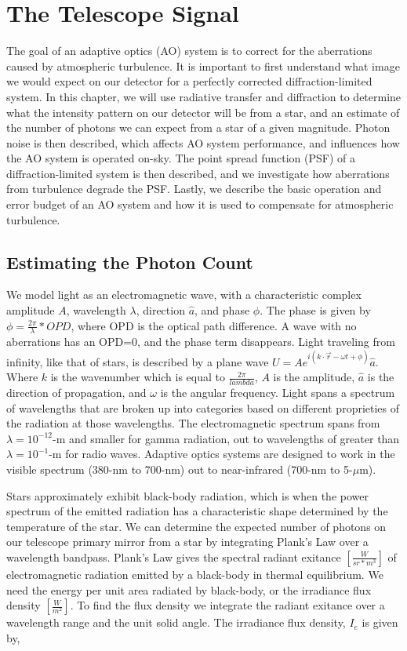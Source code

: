 \chapter{The Telescope Signal}\label{CH2}

 The goal of an adaptive optics (AO) system is to correct for the aberrations caused by atmospheric turbulence. It is important to first understand what image we would expect on our detector for a perfectly corrected diffraction-limited system. In this chapter, we will use radiative transfer and diffraction to determine what the intensity pattern on our detector will be from a star, and an estimate of the number of photons we can expect from a star of a given magnitude. Photon noise is then described, which affects AO system performance, and influences how the AO system is operated on-sky. The point spread function (PSF) of a diffraction-limited system is then described, and we investigate how aberrations from turbulence degrade the PSF. Lastly, we describe the basic operation and error budget of an AO system and how it is used to compensate for atmospheric turbulence. 

\section{Estimating the Photon Count}\label{phcount}

We model light as an electromagnetic wave, with a characteristic complex amplitude $A$, wavelength $\lambda$, direction $\hat{a}$, and phase $\phi$. The phase is given by $\phi= \frac{2\pi}{\lambda}*OPD$, where OPD is the optical path difference. A wave with no aberrations has an OPD=0, and the phase term disappears. Light traveling from infinity, like that of stars, is described by a plane wave $U=Ae^{i(k \cdot \vec{r}-\omega t+ \phi)}\hat{a}$. Where $k$ is the wavenumber which is equal to $\frac{2 \pi}{lambda}$, $A$ is the amplitude, $\hat{a}$ is the direction of propagation, and $\omega$ is the angular frequency. Light spans a spectrum of wavelengths that are broken up into categories based on different proprieties of the radiation at those wavelengths. The electromagnetic spectrum spans from $\lambda=10^{-12}$-m and smaller for gamma radiation, out to wavelengths of greater than $\lambda=10^{-1}$-m for radio waves. Adaptive optics systems are designed to work in the visible spectrum (380-nm to 700-nm) out to near-infrared (700-nm to 5-$\mu$m).



Stars approximately exhibit black-body radiation, which is when the power spectrum of the emitted radiation has a characteristic shape determined by the temperature of the star. We can determine the expected number of photons on our telescope primary mirror from a star by integrating Plank's Law over a wavelength bandpass. Plank's Law gives the spectral radiant exitance $[\frac{W}{sr*m^3}]$ of electromagnetic radiation emitted by a black-body in thermal equilibrium. We need the energy per unit area radiated by black-body, or the irradiance flux density $[\frac{W}{m^2}]$. To find the flux density we integrate the radiant exitance over a wavelength range and the unit solid angle. The irradiance flux density, $I_e$ is given by,


